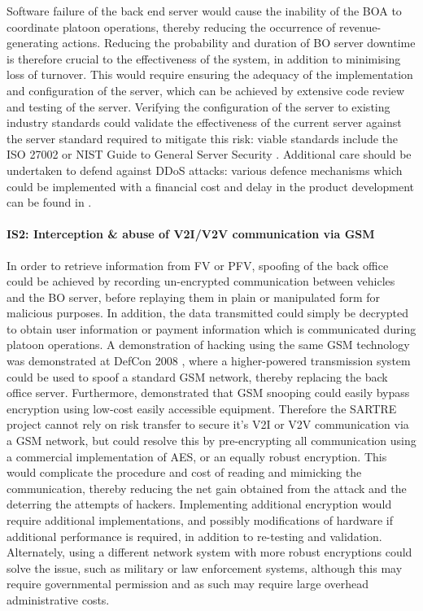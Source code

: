 \documentclass[british,11pt,a4paper]{article}
\begin{document}
Software failure of the back end server would cause the inability of the BOA to coordinate platoon operations, thereby reducing the occurrence of revenue-generating actions. Reducing the probability and duration of BO server downtime is therefore crucial to the effectiveness of the system, in addition to minimising loss of turnover. This would require ensuring the adequacy of the implementation and configuration of the server, which can be achieved by extensive code review and testing of the server. Verifying the configuration of the server to existing industry standards could validate the effectiveness of the current server against the server standard required to mitigate this risk: viable standards include the ISO 27002 \cite{Iso2005-nn} or NIST Guide to General Server Security \cite{noauthor_undated-kw}. Additional care should be undertaken to defend against DDoS attacks: various defence mechanisms which could be implemented with a financial cost and delay in the product development can be found in \citet{Zargar2013-xx}.

\paragraph{IS2: Interception \& abuse of V2I/V2V communication via GSM \newline}
\label{par:IS2}

In order to retrieve information from FV or PFV, spoofing of the back office could be achieved by recording un-encrypted communication between vehicles and the BO server, before replaying them in plain or manipulated form for malicious purposes. In addition, the data transmitted could simply be decrypted to obtain user information or payment information which is communicated during platoon operations. A demonstration of hacking using the same GSM technology was demonstrated at DefCon 2008 \cite{Paget2010-ne}, where a higher-powered transmission system could be used to spoof a standard GSM network, thereby replacing the back office server. Furthermore, \citet{Hulton2008-jr}demonstrated that GSM snooping could easily bypass encryption using low-cost easily accessible equipment. Therefore the SARTRE project cannot rely on risk transfer to secure it’s V2I or V2V communication via a GSM network, but could resolve this by pre-encrypting all communication using a commercial implementation of AES, or an equally robust encryption. This would complicate the procedure and cost of reading and mimicking the communication, thereby reducing the net gain obtained from the attack and the deterring the attempts of hackers. Implementing additional encryption would require additional implementations, and possibly modifications of hardware if additional performance is required, in addition to re-testing and validation. Alternately, using a different network system with more robust encryptions could solve the issue, such as military or law enforcement systems, although this may require governmental permission and as such may require large overhead administrative costs. 
\end{document}
